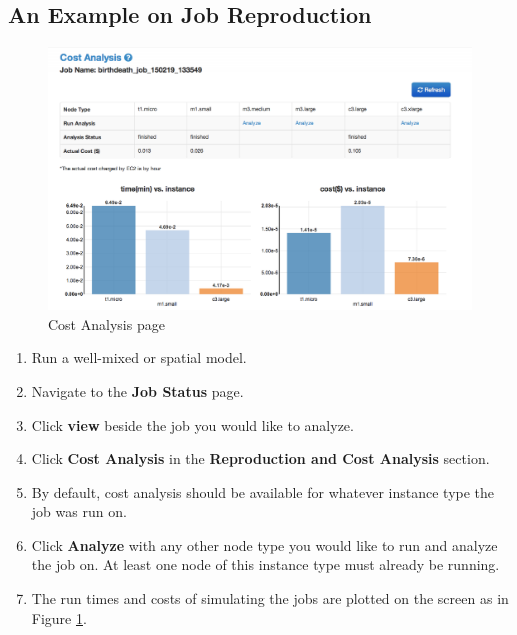 \subsection{An Example on Job Reproduction}

\begin{figure}[!ht]
\centering
\includegraphics[scale=0.30]{T6/T6_fig_costanalysis.png}
\caption{Cost Analysis page}
\label{fig:cost-analysis}
\end{figure}

\begin{enumerate}
\item Run a well-mixed or spatial model.
\item Navigate to the \textbf{Job Status} page.
\item Click \textbf{view} beside the job you would like to analyze.
\item Click \textbf{Cost Analysis} in the \textbf{Reproduction and Cost Analysis} section.
\item By default, cost analysis should be available for whatever instance type the job was run on.
\item Click \textbf{Analyze} with any other node type you would like to run and analyze the job on. At least one node of this instance type must already be running.
\item The run times and costs of simulating the jobs are plotted on the screen as in Figure \ref{fig:cost-analysis}.
\end{enumerate}
